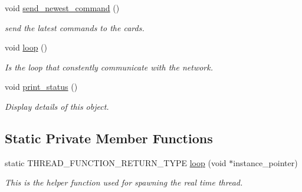 \begin{DoxyCompactItemize}
void \hyperlink{classblmc__drivers_1_1CanBusMotorBoard_a9f74868318daf4a97a5266e4d8d6f556}{send\+\_\+newest\+\_\+command} ()
\begin{DoxyCompactList}\small\item\em send the latest commands to the cards. \end{DoxyCompactList}\item 
\mbox{\label{classblmc__drivers_1_1CanBusMotorBoard_a542f8df35ff34348976ed1d55797a15a}} 
void \hyperlink{classblmc__drivers_1_1CanBusMotorBoard_a542f8df35ff34348976ed1d55797a15a}{loop} ()
\begin{DoxyCompactList}\small\item\em Is the loop that constently communicate with the network. \end{DoxyCompactList}\item 
\mbox{\label{classblmc__drivers_1_1CanBusMotorBoard_a43b773d56156d4855e6b3b7b7b00b350}} 
void \hyperlink{classblmc__drivers_1_1CanBusMotorBoard_a43b773d56156d4855e6b3b7b7b00b350}{print\+\_\+status} ()
\begin{DoxyCompactList}\small\item\em Display details of this object. \end{DoxyCompactList}\end{DoxyCompactItemize}
\subsection*{Static Private Member Functions}
\begin{DoxyCompactItemize}
\item 
static T\+H\+R\+E\+A\+D\+\_\+\+F\+U\+N\+C\+T\+I\+O\+N\+\_\+\+R\+E\+T\+U\+R\+N\+\_\+\+T\+Y\+PE \hyperlink{classblmc__drivers_1_1CanBusMotorBoard_af6d242ea933e9ad23c37167ba848f017}{loop} (void $\ast$instance\+\_\+pointer)
\begin{DoxyCompactList}\small\item\em This is the helper function used for spawning the real time thread. \end{DoxyCompactList}\end{DoxyCompactItemize}
